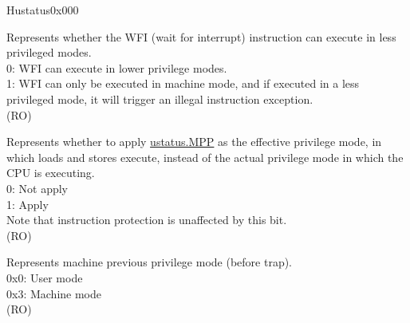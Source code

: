 \begin{register}{H}{ustatus}{0x000}\label{regdesc:USTATUS}
%
%
%
%
%
%
%
%
%
%
%
%
%
\regnewline%
\begin{regdesc}\begin{reglist}
\label{fielddesc:USTATUSTW}\item [TW] Represents whether the WFI (wait for interrupt) instruction can execute in less privileged modes. \\
0: WFI can execute in lower privilege modes.\\
1: WFI can only be executed in machine mode, and if executed in a less privileged mode, it will trigger an illegal instruction exception.\\
(RO)
\label{fielddesc:USTATUS_MPRV}\item [MPRV] Represents whether to apply \hyperref[fielddesc:USTATUSMPP]{ustatus.MPP} as the effective privilege mode, in which loads and stores execute, instead of the actual privilege mode in which the CPU is executing. \\
0: Not apply\\
1: Apply\\
Note that instruction protection is unaffected by this bit.\\
(RO)
\label{fielddesc:USTATUSMPP}\item [MPP] Represents machine previous privilege mode (before trap).\\
0x0: User mode\\
0x3: Machine mode\\
(RO)
\item [Continued on the next page...]
\end{reglist}\end{regdesc}
\end{register}
\addtocounter{Regfloat}{-1}
